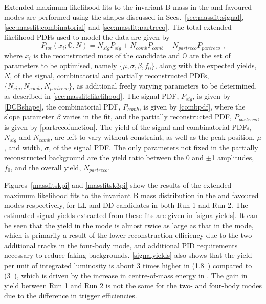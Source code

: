Extended maximum likelihood fits to the invariant B mass in the \kpi and \kpipipi favoured modes are performed using the shapes discussed in Secs.~\ref{sec:massfit:signal}, \ref{sec:massfit:combinatorial} and \ref{sec:massfit:partreco}. The total extended likelihood PDFs used to model the data are given by
\begin{equation}
P_{tot}(x_i;\mathbb{O}, N) = N_{sig}P_{sig} + N_{comb}P_{comb} + N_{partreco}P_{partreco} \text{ ,}
\label{totalpdf}
\end{equation}
where $x_i$ is the reconstructed \Bm mass of the candidate and $\mathbb{O}$ are the set of parameters to be optimised, namely $\{\mu, \sigma, \beta, f_0\}$, along with the expected yields, $N$, of the signal, combinatorial and partially reconstructed PDFs, $\{N_{sig}, N_{comb}, N_{partreco}\}$, as additional freely varying parameters to be determined, as described in \sect\ref{sec:massfit:likelihood}. The signal PDF, $P_{sig}$, is given by \eqn\ref{DCBshape}, the combinatorial PDF, $P_{comb}$, is given by \eqn\ref{combpdf}, where the slope parameter $\beta$ varies in the fit, and the partially reconstructed PDF, $P_{partreco}$, is given by \eqn\ref{partrecofunction}. The yield of the signal and combinatorial PDFs, $N_{sig}$ and $N_{comb}$, are left to vary without constraint, as well as the peak position, $\mu$, and width, $\sigma$, of the signal PDF. The only parameters not fixed in the partially reconstructed background are the yield ratio between the 0 and $\pm$1 amplitudes, $f_0$, and the overall yield, $N_{partreco}$.

Figures~\ref{massfitskpi} and \ref{massfitsk3pi} show the results of the extended maximum likelihood fits to the invariant B mass distribution in the \kpi and \kpipipi favoured modes respectively, for LL and DD candidates in both Run 1 and Run 2. The estimated signal yields extracted from these fits are given in \tab\ref{signalyields}. It can be seen that the yield in the \kpi mode is almost twice as large as that in the \kpipipi mode, which is primarily a result of the lower reconstruction efficiency due to the two additional tracks in the four-body mode, and additional PID requirements necessary to reduce faking backgrounds. \Tab\ref{signalyields} also shows that the yield per unit of integrated luminosity is about 3 times higher in \runtwo (1.8~\invfb) compared to \runone (3~\invfb), which is driven by the increase in centre-of-mass energy in \runtwo. The gain in yield between Run 1 and Run 2 is not the same for the two- and four-body modes due to the difference in trigger efficiencies.

